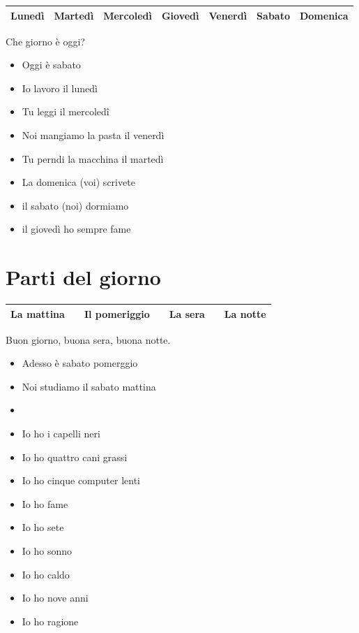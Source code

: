 \documentclass[letter,11pt]{article}
\begin{document}
\begin{tabular}{ |p{2cm}| p{2cm}| p{2cm}| p{2cm}| p{2cm}| p{2cm}| p{2cm}| }

    \hline
    \hline
    Lunedì & Martedì & Mercoledì & Giovedì & Venerdì & Sabato & Domenica\\ \hline
    \hline
\end{tabular}

\vskip 0.2in

Che giorno è oggi?
\begin{multicols}{2}
\begin{itemize}
    \item Oggi è sabato
    \item Io lavoro il lunedì
    \item Tu leggi il mercoledî
    \item Noi mangiamo la pasta il venerdì
    \item Tu perndi la macchina il martedì
    \item La domenica (voi) scrivete
    \item il sabato (noi) dormiamo
    \item il giovedì ho sempre fame
\end{itemize}
\end{multicols}

\vskip 0.2in

\section*{Parti del giorno}
\vskip 0.2in

\begin{tabular}{ |p{2.5cm}| p{0.5cm}| p{2.5cm}| p{0.5cm}| p{2.5cm}| p{0.5cm}| p{2.5cm}| }

    \hline
    La mattina &  & Il pomeriggio &  & La sera &  & La notte\\ \hline
    \hline
\end{tabular}
\vskip 0.2in
Buon giorno, buona sera, buona notte.
\begin{multicols}{2}
\begin{itemize}
    \item Adesso è sabato pomerggio
    \item Noi studiamo il sabato mattina
    \item
    \item Io ho i capelli neri
    \item Io ho quattro cani grassi
    \item Io ho cinque computer lenti

    \item Io ho fame
    \item Io ho sete
    \item Io ho sonno
    \item Io ho caldo
    \item Io ho nove anni
    \item Io ho ragione
\end{itemize}
\end{multicols}
\end{document}
